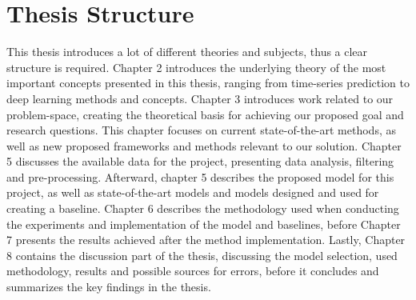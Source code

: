 
\section{Thesis Structure}
\label{sections:Introduction:Structure}

This thesis introduces a lot of different theories and subjects,
thus a clear structure is required.
Chapter 2 introduces the underlying theory of the most important concepts presented in this thesis,
ranging from time-series prediction to deep learning methods and concepts.
Chapter 3 introduces work related to our problem-space, creating the theoretical basis for achieving our proposed goal and research questions.
This chapter focuses on current state-of-the-art methods,
as well as new proposed frameworks and methods relevant to our solution.
Chapter 5 discusses the available data for the project, presenting data analysis, filtering and pre-processing.
Afterward, chapter 5 describes the proposed model for this project, as well as state-of-the-art models and models designed and used for creating a baseline.
Chapter 6 describes the methodology used when conducting the experiments and implementation of the model and baselines,
before Chapter 7 presents the results achieved after the method implementation.
Lastly, Chapter 8 contains the discussion part of the thesis, discussing the model selection, used methodology, results and possible sources for errors,
before it concludes and summarizes the key findings in the thesis.



\iffalse
  This thesis introduces a lot of different theories and subjects,
  thus a clear structure is required.
  Chapter 2 introduces the underlying theory of the most important concepts presented in this thesis,
  ranging from time-series prediction to deep learning methods and concepts.
  Chapter 3 introduces work related to our problem-space, creating the theoretical basis for achieving our proposed goal and research questions.
  This chapter focuses on current state-of-the-art methods,
  as well as new proposed frameworks and methods relevant to our solution.
  Chapter 4 introduces our proposed method and architecture,
  presenting the model framework and model structure.
  Lastly, chapter 5 supplies an evaluation and discussion of the proposed framework regarding our proposed research questions and goal.
\fi


